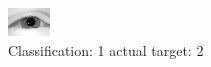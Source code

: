 \begin{figure}[h!]
\begin{center}
\includegraphics[width=0.60\columnwidth]{figures/ID2285_class_1_target_2.png}
\end{center}
\caption{ Classification: 1 actual target: 2}
\label{fig:ID2285_class_1_target_2}
\end{figure}
